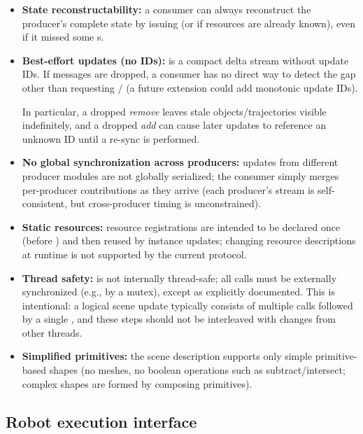 \begin{itemize}
    \item \textbf{State reconstructability:} a consumer can always reconstruct the producer's complete state by issuing  (or  if resources are already known), even if it missed some s.
    \item \textbf{Best-effort updates (no IDs):}  is a compact delta stream without update IDs. If messages are dropped, a consumer has no direct way to detect the gap other than requesting / (a future extension could add monotonic update IDs).

    In particular, a dropped \emph{remove} leaves stale objects/trajectories visible indefinitely, and a dropped \emph{add} can cause later updates to reference an unknown ID until a re-sync is performed.
    \item \textbf{No global synchronization across producers:} updates from different producer modules are not globally serialized; the consumer simply merges per-producer contributions as they arrive (each producer's stream is self-consistent, but cross-producer timing is unconstrained).
    \item \textbf{Static resources:} resource registrations are intended to be declared once (before ) and then reused by instance updates; changing resource descriptions at runtime is not supported by the current protocol.
    \item \textbf{Thread safety:}  is not internally thread-safe; all calls must be externally synchronized (e.g., by a mutex), except  as explicitly documented. This is intentional: a logical scene update typically consists of multiple  calls followed by a single , and these steps should not be interleaved with changes from other threads.
    \item \textbf{Simplified primitives:} the scene description supports only simple primitive-based shapes (no meshes, no boolean operations such as subtract/intersect; complex shapes are formed by composing primitives).
\end{itemize}



\subsection{Robot execution interface} \label{sec:ch3_robot_interface}

